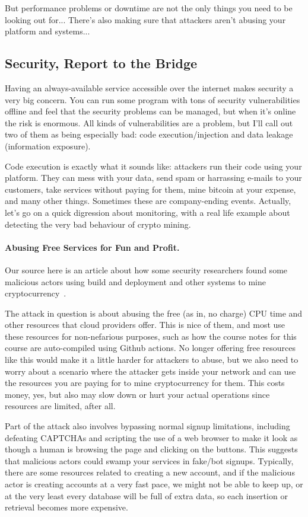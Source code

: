 \documentclass[a4paper]{report}
\begin{document}
But performance problems or downtime are not the only things you need to be looking out for... There's also making sure that attackers aren't abusing your platform and systems...

\subsection*{Security, Report to the Bridge}
Having an always-available service accessible over the internet makes security a very big concern. You can run some program with tons of security vulnerabilities offline and feel that the security problems can be managed, but when it's online the risk is enormous. All kinds of vulnerabilities are a problem, but I'll call out two of them as being especially bad: code execution/injection and data leakage (information exposure). 

Code execution is exactly what it sounds like: attackers run their code using your platform. They can mess with your data, send spam or harrassing e-mails to your customers, take services without paying for them, mine bitcoin at your expense, and many other things. Sometimes these are company-ending events. Actually, let's go on a quick digression about monitoring, with a real life example about detecting the very bad behaviour of crypto mining.

\paragraph{Abusing Free Services for Fun and Profit.}
Our source here is an article about how some security researchers found some malicious actors using build and deployment and other systems to mine cryptocurrency~\cite{sysdig}.

The attack in question is about abusing the free (as in, no charge) CPU time and other resources that cloud providers offer. This is nice of them, and most use these resources for non-nefarious purposes, such as how the course notes for this course are auto-compiled using Github actions. No longer offering free resources like this would make it a little harder for attackers to abuse, but we also need to worry about a scenario where the attacker gets inside your network and can use the resources you are paying for to mine cryptocurrency for them. This costs money, yes, but also may slow down or hurt your actual operations since resources are limited, after all.

Part of the attack also involves bypassing normal signup limitations, including defeating CAPTCHAs and scripting the use of a web browser to make it look as though a human is browsing the page and clicking on the buttons. This suggests that malicious actors could swamp your services in fake/bot signups. Typically, there are some resources related to creating a new account, and if the malicious actor is creating accounts at a very fast pace, we might not be able to keep up, or at the very least every database will be full of extra data, so each insertion or retrieval becomes more expensive.
\end{document}
